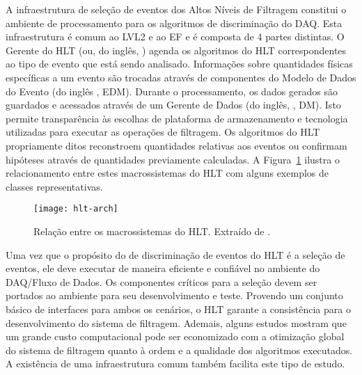 A infraestrutura de seleção de eventos dos Altos Níveis de Filtragem constitui
o ambiente de processamento para os algoritmos de discriminação do DAQ. Esta
infraestrutura é comum ao LVL2 e ao EF e é composta de 4 partes distintas. O
Gerente do HLT (ou, do inglês, ) agenda os algoritmos do HLT
correspondentes ao tipo de evento que está sendo analisado. Informações sobre
quantidades físicas específicas a um evento são trocadas através de
componentes do Modelo de Dados do Evento (do inglês ,
EDM). Durante o processamento, os dados gerados são guardados e acessados
através de um Gerente de Dados (do inglês, , DM). Isto
permite transparência às escolhas de plataforma de armazenamento e tecnologia
utilizadas para executar as operações de filtragem. Os algoritmos do HLT
propriamente ditos reconstroem quantidades relativas aos eventos ou confirmam
hipóteses através de quantidades previamente calculadas. A
Figura~\ref{fig:hlt-arch} ilustra o relacionamento entre estes macrossistemas
do HLT com alguns exemplos de classes representativas.

\begin{figure}
\begin{center}
\texttt{[image: hlt-arch]}
\end{center}
\caption[Relação entre os macrossistemas do HLT.]{Relação entre os
macrossistemas do HLT. Extraído de \cite{hlt-tdr}.}
\label{fig:hlt-arch}
\end{figure}

Uma vez que o propósito do  de discriminação de eventos do HLT é
a seleção de eventos, ele deve executar de maneira eficiente e confiável no
ambiente do DAQ/Fluxo de Dados. Os componentes críticos para a seleção devem
ser portados ao ambiente  para seu desenvolvimento e
teste. Provendo um conjunto básico de interfaces para ambos os cenários, o HLT
garante a consistência para o desenvolvimento do sistema de
filtragem. Ademais, alguns estudos \cite{jb:e-gamma} mostram que um grande
custo computacional pode ser economizado com a otimização global do sistema de
filtragem quanto à ordem e a qualidade dos algoritmos executados. A existência
de uma infraestrutura comum também facilita este tipo de estudo.

